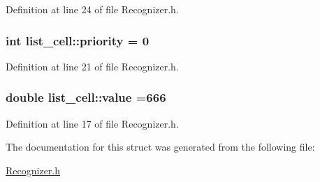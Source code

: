 Definition at line 24 of file Recognizer.\+h.

\hypertarget{structlist__cell_afd51de45bab516a708417ccc2868595c}{}
\subsubsection[{priority}]{\setlength{\rightskip}{0pt plus 5cm}int list\+\_\+cell\+::priority = 0}\label{structlist__cell_afd51de45bab516a708417ccc2868595c}


Definition at line 21 of file Recognizer.\+h.

\hypertarget{structlist__cell_a5f4d22d779ccc8d4fcf59b2ac35950ec}{}
\subsubsection[{value}]{\setlength{\rightskip}{0pt plus 5cm}double list\+\_\+cell\+::value =666}\label{structlist__cell_a5f4d22d779ccc8d4fcf59b2ac35950ec}


Definition at line 17 of file Recognizer.\+h.



The documentation for this struct was generated from the following file\+:\begin{DoxyCompactItemize}
\item 
\hyperlink{Recognizer_8h}{Recognizer.\+h}\end{DoxyCompactItemize}
